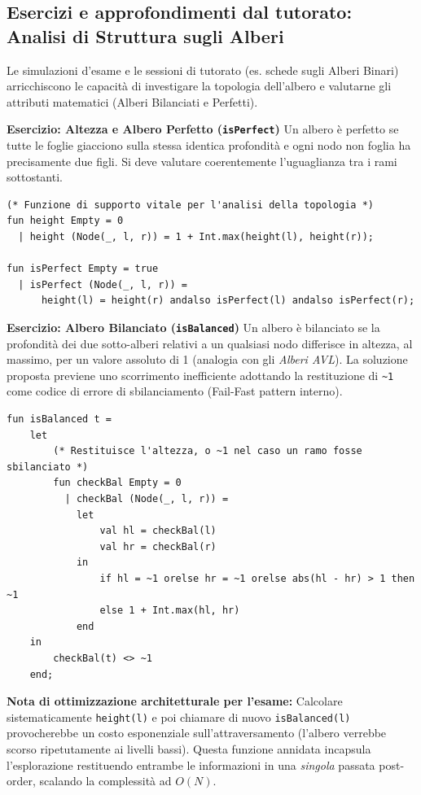 \documentclass[12pt, a4paper]{article}
\begin{document}
\subsection{Esercizi e approfondimenti dal tutorato: Analisi di Struttura sugli Alberi}
Le simulazioni d'esame e le sessioni di tutorato (es. schede sugli Alberi Binari) arricchiscono le capacità di investigare la topologia dell'albero e valutarne gli attributi matematici (Alberi Bilanciati e Perfetti).

\textbf{Esercizio: Altezza e Albero Perfetto (\texttt{isPerfect})}
Un albero è perfetto se tutte le foglie giacciono sulla stessa identica profondità e ogni nodo non foglia ha precisamente due figli. Si deve valutare coerentemente l'uguaglianza tra i rami sottostanti.
\begin{verbatim}
(* Funzione di supporto vitale per l'analisi della topologia *)
fun height Empty = 0
  | height (Node(_, l, r)) = 1 + Int.max(height(l), height(r));

fun isPerfect Empty = true
  | isPerfect (Node(_, l, r)) = 
      height(l) = height(r) andalso isPerfect(l) andalso isPerfect(r);
\end{verbatim}

\newpage

\textbf{Esercizio: Albero Bilanciato (\texttt{isBalanced})}
Un albero è bilanciato se la profondità dei due sotto-alberi relativi a un qualsiasi nodo differisce in altezza, al massimo, per un valore assoluto di 1 (analogia con gli \textit{Alberi AVL}). La soluzione proposta previene uno scorrimento inefficiente adottando la restituzione di \texttt{\~{}1} come codice di errore di sbilanciamento (Fail-Fast pattern interno).
\begin{verbatim}
fun isBalanced t =
    let
        (* Restituisce l'altezza, o ~1 nel caso un ramo fosse sbilanciato *)
        fun checkBal Empty = 0
          | checkBal (Node(_, l, r)) =
            let
                val hl = checkBal(l)
                val hr = checkBal(r)
            in
                if hl = ~1 orelse hr = ~1 orelse abs(hl - hr) > 1 then ~1
                else 1 + Int.max(hl, hr)
            end
    in
        checkBal(t) <> ~1
    end;
\end{verbatim}
\textbf{Nota di ottimizzazione architetturale per l'esame:} Calcolare sistematicamente \texttt{height(l)} e poi chiamare di nuovo \texttt{isBalanced(l)} provocherebbe un costo esponenziale sull'attraversamento (l'albero verrebbe scorso ripetutamente ai livelli bassi). Questa funzione annidata incapsula l'esplorazione restituendo entrambe le informazioni in una \textit{singola} passata post-order, scalando la complessità ad $O(N)$.
\end{document}
